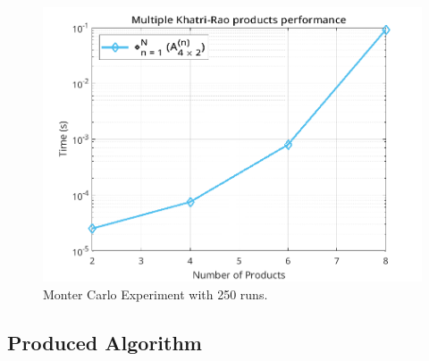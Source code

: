 \documentclass[a4paper,10pt]{article}
\begin{document}
    \begin{figure}[ht!]
        \centering 
        \includegraphics[width=0.75\linewidth]{figs/hw2a3.png} \par 
        \caption{Monter Carlo Experiment with 250 runs.}
        \label{fig:hw2a3} 
    \end{figure}
    
    \newpage
    \subsection*{Produced Algorithm}
\end{document}
